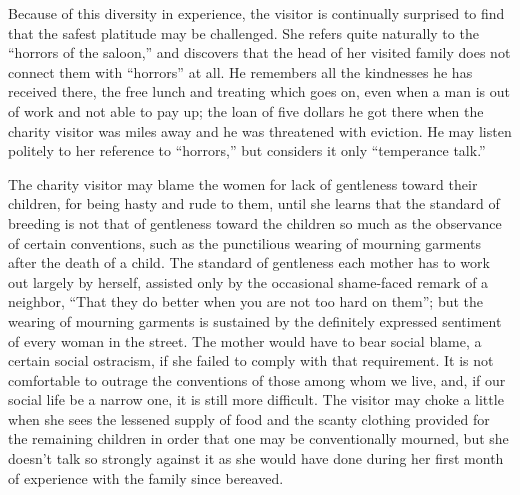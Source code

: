 \documentclass[]{article}
\begin{document}
\begin{sectionbody}
\addamsparagraph Because of this diversity in experience, the visitor is continually
surprised to find that the safest platitude may be challenged. She
refers quite naturally to the ``horrors of the saloon,'' and discovers
that the head of her visited family does not connect them with ``horrors''
at all. He remembers all the kindnesses he has received there, the free
lunch and treating which goes on, even when a man is out of work and not
able to pay up; the loan of five dollars he got there when the charity
visitor was miles away and he was threatened with eviction. He may
listen politely to her reference to ``horrors,'' but considers it only
``temperance talk.''

\addamsparagraph The charity visitor may blame the women for lack of gentleness toward
their children, for being hasty and rude to them, until she learns that
the standard of breeding is not that of gentleness toward the children
so much as the observance of certain conventions, such as the
punctilious wearing of mourning garments after the death of a child. The
standard of gentleness each mother has to work out largely by herself,
assisted only by the occasional shame-faced remark of a neighbor, ``That
they do better when you are not too hard on them''; but the wearing of
mourning garments is sustained by the definitely expressed sentiment of
every woman in the street. The mother would have to bear social blame, a
certain social ostracism, if she failed to comply with that requirement.
It is not comfortable to outrage the conventions of those among whom we
live, and, if our social life be a narrow one, it is still more
difficult. The visitor may choke a little when she sees the lessened
supply of food and the scanty clothing provided for the remaining
children in order that one may be conventionally mourned, but she
doesn't talk so strongly against it as she would have done during her
first month of experience with the family since bereaved.


\end{sectionbody}
\end{document}
